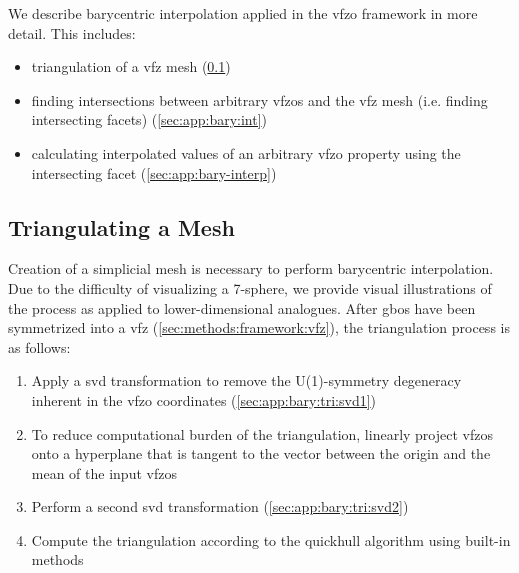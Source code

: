\documentclass[final,twocolumn,12pt]{elsarticle}
\newcommand{\inpt}{input}
\begin{document}
{\begin{appendices}
We describe barycentric interpolation applied in the \gls{vfzo} framework in more detail. This includes:
\begin{itemize}
    \item[1] triangulation of a \gls{vfz} mesh (\cref{sec:app:bary:tri})
    \item[2] finding intersections between arbitrary \glspl{vfzo} and the \gls{vfz} mesh (i.e. finding intersecting facets) (\cref{sec:app:bary:int})
    \item[3] calculating interpolated values of an arbitrary \gls{vfzo} property using the intersecting facet (\cref{sec:app:bary-interp})
\end{itemize}

\subsection{Triangulating a  Mesh}
\label{sec:app:bary:tri}

Creation of a simplicial mesh is necessary to perform barycentric interpolation. Due to the difficulty of visualizing a 7-sphere, we provide visual illustrations of the process as applied to lower-dimensional analogues. After \glspl{gbo} have been symmetrized into a \gls{vfz} (\cref{sec:methods:framework:vfz}), the triangulation process is as follows:
\begin{enumerate}
    \item[1.1] Apply a \gls{svd} transformation to remove the U(1)-symmetry degeneracy inherent in the \gls{vfzo} coordinates (\cref{sec:app:bary:tri:svd1})
    \item[1.2] To reduce computational burden of the triangulation, linearly project \glspl{vfzo} onto a hyperplane that is tangent to the vector between the origin and the mean of the \inpt{} \glspl{vfzo}
    \item[1.3] Perform a second \gls{svd} transformation (\cref{sec:app:bary:tri:svd2})
    \item[1.4] Compute the triangulation according to the quickhull algorithm \cite{barberQuickhullAlgorithmConvex1996} using built-in methods
\end{enumerate}


\end{appendices}}
\end{document}
